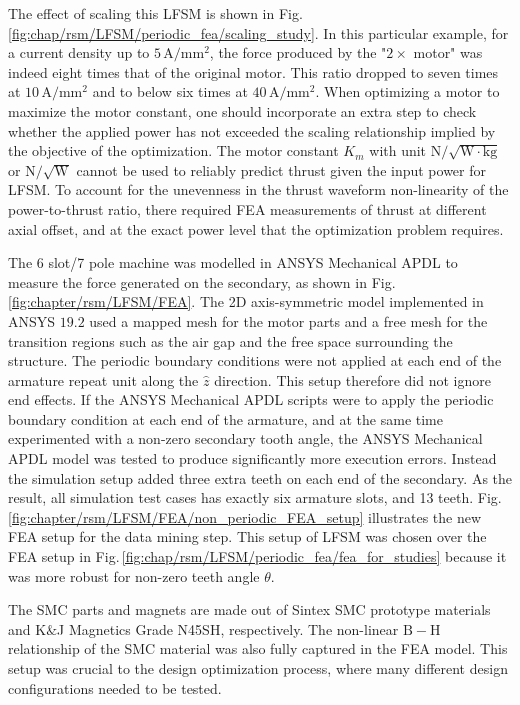     
            The effect of scaling this \acs{LFSM} is shown in Fig.\,\ref{fig:chap/rsm/LFSM/periodic_fea/scaling_study}. In this particular example, for a current density up to $5\,\mathrm{A/ mm^2}$, the force produced by the "$2\times$ motor" was indeed eight times that of the original motor. This ratio dropped to seven times at $10\,\mathrm{A/ mm^2}$ and to below six times at $40\,\mathrm{A/ mm^2}$. When optimizing a motor to maximize the motor constant, one should incorporate an extra step to check whether the applied power has not exceeded the scaling relationship implied by the objective of the optimization. The motor constant $K_m$ with unit $\mathrm{N/\sqrt{W\cdot kg}}$ or $\mathrm{N/\sqrt{W}}$ cannot be used to reliably predict thrust given the input power for \acs{LFSM}. To account for the unevenness in the thrust waveform non-linearity of the power-to-thrust ratio, there required \acs{FEA} measurements of thrust at different axial offset, and at the exact power level that the optimization problem requires.
            

            The 6 slot/7 pole machine was modelled in ANSYS Mechanical APDL to measure the force generated on the secondary, as shown in Fig.\,\ref{fig:chapter/rsm/LFSM/FEA}. The 2D axis-symmetric model implemented in ANSYS  $19.2$ used a mapped mesh for the motor parts and a free mesh for the transition regions such as the air gap and the free space surrounding the structure. The periodic boundary conditions were not applied at each end of the armature repeat unit along the $\hat{z}$ direction. This setup therefore did not ignore end effects. If the ANSYS Mechanical APDL scripts were to apply the periodic boundary condition at each end of the armature, and at the same time experimented with a non-zero secondary tooth angle, the ANSYS Mechanical APDL model was tested to produce significantly more execution errors. Instead the simulation setup added three extra teeth on each end of the secondary. As the result, all simulation test cases has exactly six armature slots, and 13 teeth. Fig.\,\ref{fig:chapter/rsm/LFSM/FEA/non_periodic_FEA_setup} illustrates the new \acs{FEA} setup for the data mining step. This setup of \acs{LFSM} was chosen over the \acs{FEA} setup in Fig.\,\ref{fig:chap/rsm/LFSM/periodic_fea/fea_for_studies} because it was more robust for non-zero teeth angle $\theta$.
            

            The \acs{SMC} parts and magnets are made out of Sintex \acs{SMC} prototype materials and K$\&$J Magnetics Grade N45SH, respectively. The non-linear $\mathrm{B-H}$ relationship of the \acs{SMC} material was also fully captured in the FEA model. This setup was crucial to the design optimization process, where many different design configurations needed to be tested.
            
